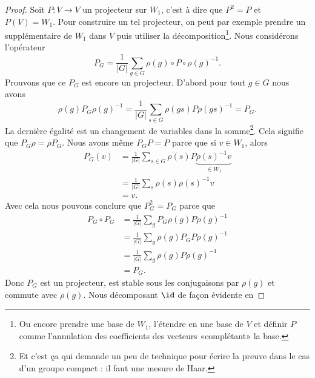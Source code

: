 \begin{proof}
    Soit \( P\colon V\to V\) un projecteur sur \( W_1\), c'est à dire que \( P^2=P\) et \( P(V)=W_1\). Pour construire un tel projecteur, on peut par exemple prendre un supplémentaire de \( W_1\) dans \( V\) puis utiliser la décomposition\footnote{Ou encore prendre une base de \( W_1\), l'étendre en une base de \( V\) et définir \( P\) comme l'annulation des coefficients des vecteurs «complétant» la base.}. Nous considérons l'opérateur
    \begin{equation}
        P_G=\frac{1}{ | G | }\sum_{g\in G}\rho(g)\circ P\circ \rho(g)^{-1}.
    \end{equation}
    Prouvons que ce \( P_G\) est encore un projecteur. D'abord pour tout \( g\in G\) nous avons
    \begin{equation}
        \rho(g)P_G\rho(g)^{-1}=\frac{1}{ | G | }\sum_{s\in G}\rho(gs)P\rho(gs)^{-1}=P_G.
    \end{equation}
    La dernière égalité est un changement de variables dans la somme\footnote{Et c'est ça qui demande un peu de technique pour écrire la preuve dans le cas d'un groupe compact : il faut une mesure de Haar.}. Cela signifie que \( P_G\rho=\rho P_G\). Nous avons même \( P_GP=P\) parce que si \( v\in W_1\), alors 
    \begin{subequations}
        \begin{align}
            P_G(v)&=\frac{1}{ | G | }\sum_{s\in G}\rho(s)P\underbrace{\rho(s)^{-1} v}_{\in W_1}\\
            &=\frac{1}{ | G | }\sum_s\rho(s)\rho(s)^{-1} v\\
            &=v.
        \end{align}
    \end{subequations}
    Avec cela nous pouvons conclure que \( P_G^2=P_G\) parce que
    \begin{subequations}
        \begin{align}
            P_G\circ P_G&=\frac{1}{ | G | }\sum_g P_G\rho(g)P\rho(g)^{-1}\\
            &=\frac{1}{ | G | }\sum_g \rho(g)P_GP\rho(g)^{-1}\\
            &=\frac{1}{ | G | }\sum_g \rho(g)P\rho(g)^{-1}\\
            &=P_G.
        \end{align}
    \end{subequations}
    Donc \( P_G\) est un projecteur, est stable sous les conjugaisons par \( \rho(g)\) et commute avec \( \rho(g)\). Nous décomposant \( \id\) de façon évidente en

\end{proof}
